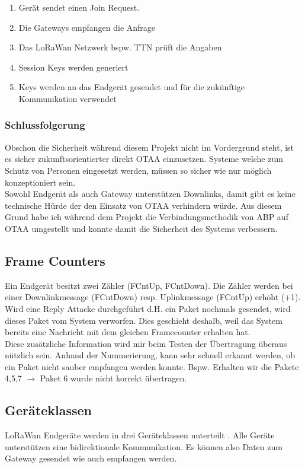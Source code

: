 \documentclass[11pt,english,german]{report}
\theoremstyle{definition}
\begin{document}
\begin{enumerate}
	\item Gerät sendet einen Join Request.
	\item Die Gateways empfangen die Anfrage
	\item Das LoRaWan Netzwerk  bspw. TTN prüft die Angaben
	\item Session Keys werden generiert
	\item Keys werden an das Endgerät gesendet und für die zukünftige Kommunikation verwendet
\end{enumerate}

\newpage
\subsubsection{Schlussfolgerung}
Obschon die Sicherheit während diesem Projekt nicht im Vordergrund steht, ist es sicher zukunftsorientierter direkt OTAA einzusetzen. Systeme welche zum Schutz von Personen eingesetzt werden, müssen so sicher wie nur möglich konzeptioniert sein.\\[0.3cm]
Sowohl Endgerät als auch Gateway unterstützen Downlinks, damit gibt es keine technische Hürde der den Einsatz von OTAA verhindern würde. Aus diesem Grund habe ich während dem Projekt die Verbindungsmethodik von ABP auf OTAA umgestellt und konnte damit die Sicherheit des Systems verbessern.

\subsection{Frame Counters}
Ein Endgerät besitzt zwei Zähler (FCntUp, FCntDown). Die Zähler werden bei einer Downlinkmessage (FCntDown) resp. Uplinkmessage (FCntUp) erhöht (+1).\\[0.3cm]
Wird eine Reply Attacke durchgeführt d.H. ein Paket nochmals gesendet, wird dieses Paket vom System verworfen. Dies geschieht deshalb, weil das System bereits eine Nachricht mit dem gleichen Framecounter erhalten hat.\\[0.3cm]
Diese zusätzliche Information wird mir beim Testen der Übertragung überaus nützlich sein. Anhand der Nummerierung, kann sehr schnell erkannt werden, ob ein Paket nicht sauber empfangen werden konnte. Bspw. Erhalten wir die Pakete 4,5,7 $\rightarrow$ Paket 6 wurde nicht korrekt übertragen.

\newpage
\subsection{Geräteklassen}
LoRaWan Endgeräte werden in drei Geräteklassen unterteilt \cite{lorawan_classes}. Alle Geräte unterstützen eine bidirektionale Kommunikation. Es können also Daten zum Gateway gesendet wie auch empfangen werden.
\end{document}
